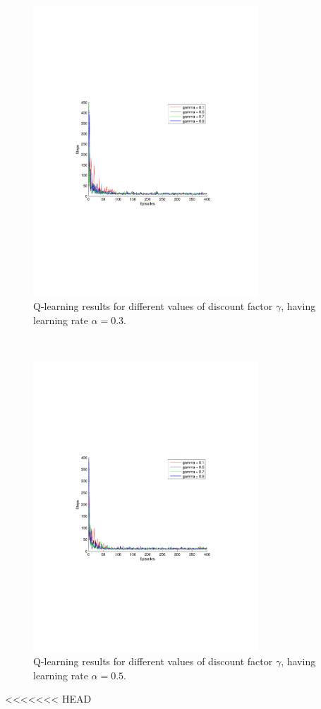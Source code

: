 \documentclass[a4paper,11pt]{article}
\begin{document}
\begin{figure}[h!]
  \centering
    \includegraphics[trim=4cm 8.5cm 4cm 8.5cm,clip,width=0.75\textwidth]{figures/qla03.pdf}
    \caption{Q-learning results for different values of discount factor $\gamma$, having learning rate $\alpha = 0.3$.}
    \label{q03}
\end{figure}
~
\begin{figure}[h!]
  \centering
    \includegraphics[trim=4cm 8.5cm 4cm 8.5cm,clip,width=0.75\textwidth]{figures/qla05.pdf}
    \caption{Q-learning results for different values of discount factor $\gamma$, having learning rate $\alpha = 0.5$.}
    \label{q05}
\end{figure}
<<<<<<< HEAD
\end{document}
